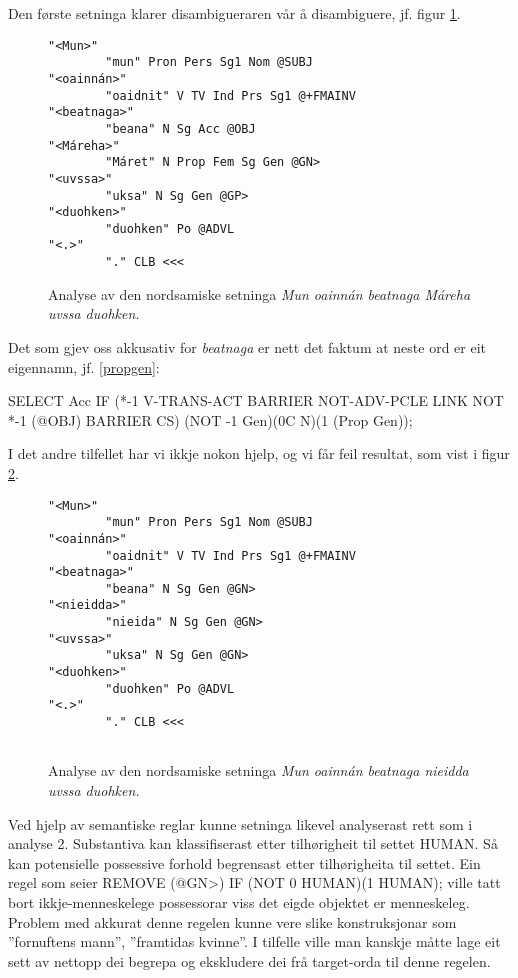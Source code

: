 \documentclass[a4paper,norsk]{article}
\begin{document}
Den første setninga klarer disambigueraren vår å disambiguere, jf. figur \ref{Mareha}. %

\begin{figure}[htbp]
\begin{center}
\begin{verbatim}
"<Mun>" 
        "mun" Pron Pers Sg1 Nom @SUBJ
"<oainnán>"
        "oaidnit" V TV Ind Prs Sg1 @+FMAINV
"<beatnaga>" 
        "beana" N Sg Acc @OBJ
"<Máreha>" 
        "Máret" N Prop Fem Sg Gen @GN>
"<uvssa>" 
        "uksa" N Sg Gen @GP>
"<duohken>"
        "duohken" Po @ADVL
"<.>"
        "." CLB <<<
\end{verbatim}
\caption{Analyse av den nordsamiske setninga \textit{Mun oainnán beatnaga Máreha uvssa duohken.}}
\label{Mareha}
\end{center}
\end{figure}


Det som gjev oss akkusativ for \textit{beatnaga} er nett det faktum at neste ord er eit eigennamn, jf. \ref{propgen}: %

\begin{example}\label{propgen}
SELECT Acc IF (*-1 V-TRANS-ACT BARRIER NOT-ADV-PCLE LINK NOT *-1 (@OBJ) BARRIER CS)
	(NOT -1 Gen)(0C N)(1 (Prop Gen));
\end{example}

I det andre tilfellet har vi ikkje nokon hjelp, og vi får feil resultat, som vist i figur \ref{beatnaga}. %


\begin{figure}[htbp]
\begin{center}
\begin{verbatim}
"<Mun>"
        "mun" Pron Pers Sg1 Nom @SUBJ
"<oainnán>"
        "oaidnit" V TV Ind Prs Sg1 @+FMAINV
"<beatnaga>"
        "beana" N Sg Gen @GN>
"<nieidda>"
        "nieida" N Sg Gen @GN>
"<uvssa>"
        "uksa" N Sg Gen @GN>
"<duohken>"
        "duohken" Po @ADVL
"<.>"
        "." CLB <<<
        

\end{verbatim}
\caption{Analyse av den nordsamiske setninga \textit{Mun oainnán beatnaga nieidda uvssa duohken.}}
\label{beatnaga}
\end{center}
\end{figure}

Ved hjelp av semantiske reglar kunne setninga likevel analyserast rett som i analyse 2. Substantiva kan klassifiserast etter tilhørigheit til settet HUMAN. Så kan potensielle possessive forhold begrensast etter tilhørigheita til settet. Ein regel som seier REMOVE (@GN>) IF (NOT 0 HUMAN)(1 HUMAN); ville tatt bort ikkje-menneskelege possessorar viss det eigde objektet er menneskeleg. Problem med akkurat denne regelen kunne vere slike konstruksjonar som ''fornuftens mann'', ''framtidas kvinne''. I tilfelle ville man kanskje måtte lage eit sett av nettopp dei begrepa og ekskludere dei frå target-orda til denne regelen.
\end{document}
